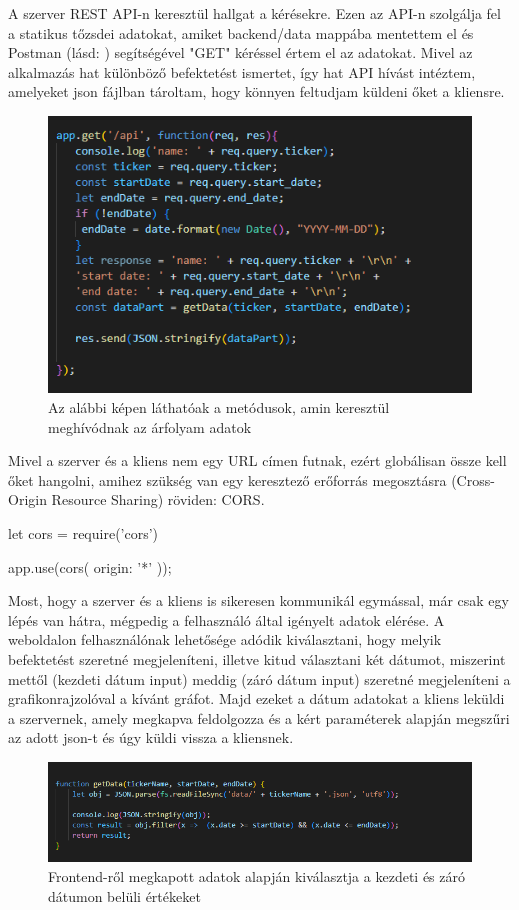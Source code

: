 A szerver REST API-n keresztül hallgat a kérésekre. Ezen az API-n szolgálja fel a statikus tőzsdei adatokat, amiket backend/data mappába mentettem el és Postman  (lásd: ) segítségével "GET" kéréssel értem el az adatokat. Mivel az alkalmazás hat különböző befektetést ismertet, így hat API hívást intéztem, amelyeket json fájlban tároltam, hogy könnyen feltudjam küldeni őket a kliensre.

\begin{figure}[h]
\centering
\includegraphics[scale=0.8]{images/apiCall.png}
\caption{Az alábbi képen láthatóak a metódusok, amin keresztül meghívódnak az árfolyam adatok}
\end{figure}

Mivel a szerver és a kliens nem egy URL címen futnak, ezért globálisan össze kell őket hangolni, amihez szükség van egy keresztező erőforrás megosztásra (Cross-Origin Resource Sharing) röviden: CORS. 
 
\pagebreak

\begin{cpp}
let cors = require('cors')

app.use(cors({
   origin: '*'
}));
\end{cpp} 

Most, hogy a szerver és a kliens is sikeresen kommunikál egymással, már csak egy lépés van hátra, mégpedig a felhasználó által igényelt adatok elérése. A weboldalon felhasználónak lehetősége adódik kiválasztani, hogy melyik befektetést szeretné megjeleníteni, illetve kitud választani két dátumot, miszerint mettől (kezdeti dátum input) meddig (záró dátum input) szeretné megjeleníteni a grafikonrajzolóval a kívánt gráfot. Majd ezeket a dátum adatokat a kliens leküldi a szervernek, amely megkapva feldolgozza és a kért paraméterek alapján megszűri az adott json-t és úgy küldi vissza a kliensnek.

\begin{figure}[h]
\centering
\includegraphics[scale=0.7]{images/getData.png}
\caption{Frontend-ről megkapott adatok alapján kiválasztja a kezdeti és záró dátumon belüli értékeket}
\end{figure}